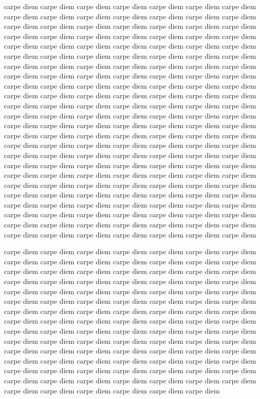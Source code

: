 carpe diem carpe diem carpe diem carpe diem carpe diem carpe diem carpe diem carpe diem 
carpe diem carpe diem carpe diem carpe diem carpe diem carpe diem carpe diem carpe diem 
carpe diem carpe diem carpe diem carpe diem carpe diem carpe diem carpe diem carpe diem 
carpe diem carpe diem carpe diem carpe diem carpe diem carpe diem carpe diem carpe diem 
carpe diem carpe diem carpe diem carpe diem carpe diem carpe diem carpe diem carpe diem 
carpe diem carpe diem carpe diem carpe diem carpe diem carpe diem carpe diem carpe diem 
carpe diem carpe diem carpe diem carpe diem carpe diem carpe diem carpe diem carpe diem 
carpe diem carpe diem carpe diem carpe diem carpe diem carpe diem carpe diem carpe diem 
carpe diem carpe diem carpe diem carpe diem carpe diem carpe diem carpe diem carpe diem 
carpe diem carpe diem carpe diem carpe diem carpe diem carpe diem carpe diem carpe diem 
carpe diem carpe diem carpe diem carpe diem carpe diem carpe diem carpe diem carpe diem 
carpe diem carpe diem carpe diem carpe diem carpe diem carpe diem carpe diem carpe diem 
carpe diem carpe diem carpe diem carpe diem carpe diem carpe diem carpe diem carpe diem 
carpe diem carpe diem carpe diem carpe diem carpe diem carpe diem carpe diem carpe diem 
carpe diem carpe diem carpe diem carpe diem carpe diem carpe diem carpe diem carpe diem 
carpe diem carpe diem carpe diem carpe diem carpe diem carpe diem carpe diem carpe diem 
carpe diem carpe diem carpe diem carpe diem carpe diem carpe diem carpe diem carpe diem 
carpe diem carpe diem carpe diem carpe diem carpe diem carpe diem carpe diem carpe diem 
carpe diem carpe diem carpe diem carpe diem carpe diem carpe diem carpe diem carpe diem 
carpe diem carpe diem carpe diem carpe diem carpe diem carpe diem carpe diem carpe diem 
carpe diem carpe diem carpe diem carpe diem carpe diem carpe diem carpe diem carpe diem 


carpe diem carpe diem carpe diem carpe diem carpe diem carpe diem carpe diem carpe diem 
carpe diem carpe diem carpe diem carpe diem carpe diem carpe diem carpe diem carpe diem 
carpe diem carpe diem carpe diem carpe diem carpe diem carpe diem carpe diem carpe diem 
carpe diem carpe diem carpe diem carpe diem carpe diem carpe diem carpe diem carpe diem 
carpe diem carpe diem carpe diem carpe diem carpe diem carpe diem carpe diem carpe diem 
carpe diem carpe diem carpe diem carpe diem carpe diem carpe diem carpe diem carpe diem 
carpe diem carpe diem carpe diem carpe diem carpe diem carpe diem carpe diem carpe diem 
carpe diem carpe diem carpe diem carpe diem carpe diem carpe diem carpe diem carpe diem 
carpe diem carpe diem carpe diem carpe diem carpe diem carpe diem carpe diem carpe diem 
carpe diem carpe diem carpe diem carpe diem carpe diem carpe diem carpe diem carpe diem 
carpe diem carpe diem carpe diem carpe diem carpe diem carpe diem carpe diem carpe diem 
carpe diem carpe diem carpe diem carpe diem carpe diem carpe diem carpe diem carpe diem 
carpe diem carpe diem carpe diem carpe diem carpe diem carpe diem carpe diem carpe diem 


